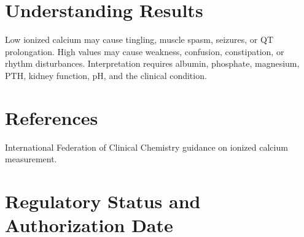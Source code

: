 \section*{Understanding Results}
Low ionized calcium may cause tingling, muscle spasm, seizures, or QT prolongation. High values may cause weakness, confusion, constipation, or rhythm disturbances. Interpretation requires albumin, phosphate, magnesium, PTH, kidney function, pH, and the clinical condition.

\section*{References}
International Federation of Clinical Chemistry guidance on ionized calcium measurement.

\clearpage


\section*{Regulatory Status and Authorization Date}

\clearpage
